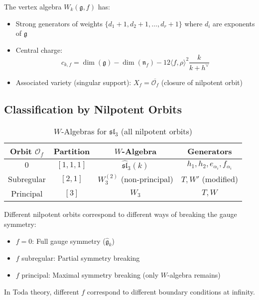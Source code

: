 \begin{theorem}
\label{thm:arakawa-structure}
The vertex algebra $W_k(\mathfrak{g}, f)$ has:
\begin{itemize}
\item Strong generators of weights $\{d_1+1, d_2+1, \ldots, d_r+1\}$ where $d_i$ are exponents of $\mathfrak{g}$
\item Central charge:
$$c_{k,f} = \dim(\mathfrak{g}) - \dim(\mathfrak{n}_f) - 12\langle f, \rho \rangle^2 \frac{k}{k+h^\vee}$$
\item Associated variety (singular support): $X_f = \overline{\mathcal{O}_f}$ (closure of nilpotent orbit)
\end{itemize}
\end{theorem}

\subsection{Classification by Nilpotent Orbits}

\begin{table}[h]
\centering
\caption{$W$-Algebras for $\mathfrak{sl}_3$ (all nilpotent orbits)}
\begin{tabular}{|c|c|c|c|}
\hline
\textbf{Orbit $\mathcal{O}_f$} & \textbf{Partition} & \textbf{$W$-Algebra} & \textbf{Generators} \\
\hline
$0$ & $[1,1,1]$ & $\widehat{\mathfrak{sl}}_3(k)$ & $h_1, h_2, e_{\alpha_i}, f_{\alpha_i}$ \\
Subregular & $[2,1]$ & $W_3^{(2)}$ (non-principal) & $T, W'$ (modified) \\
Principal & $[3]$ & $W_3$ & $T, W$ \\
\hline
\end{tabular}
\end{table}

\begin{remark}
Different nilpotent orbits correspond to different ways of breaking the gauge symmetry:
\begin{itemize}
\item $f = 0$: Full gauge symmetry ($\widehat{\mathfrak{g}}_k$)
\item $f$ subregular: Partial symmetry breaking
\item $f$ principal: Maximal symmetry breaking (only $W$-algebra remains)
\end{itemize}

In Toda theory, different $f$ correspond to different boundary conditions at infinity.
\end{remark}


